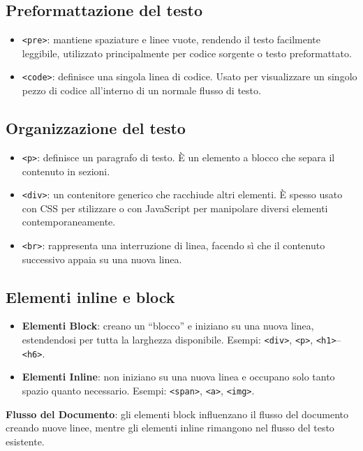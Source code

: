 \subsection{Preformattazione del testo}

\begin{itemize}
    \item \texttt{<pre>}: mantiene spaziature e linee vuote, rendendo il testo facilmente leggibile, utilizzato principalmente per codice sorgente o testo preformattato.
    \item \texttt{<code>}: definisce una singola linea di codice. Usato per visualizzare un singolo pezzo di codice all'interno di un normale flusso di testo.
\end{itemize}

\subsection{Organizzazione del testo}

\begin{itemize}
    \item \texttt{<p>}: definisce un paragrafo di testo. È un elemento a blocco che separa il contenuto in sezioni.
    \item \texttt{<div>}: un contenitore generico che racchiude altri elementi. È spesso usato con CSS per stilizzare o con JavaScript per manipolare diversi elementi contemporaneamente.
    \item \texttt{<br>}: rappresenta una interruzione di linea, facendo sì che il contenuto successivo appaia su una nuova linea.
\end{itemize}

\subsection{Elementi inline e block}

\begin{itemize}
    \item \textbf{Elementi Block}: creano un ``blocco'' e iniziano su una nuova linea, estendendosi per tutta la larghezza disponibile. Esempi: \texttt{<div>}, \texttt{<p>}, \texttt{<h1>}--\texttt{<h6>}.
    \item \textbf{Elementi Inline}: non iniziano su una nuova linea e occupano solo tanto spazio quanto necessario. Esempi: \texttt{<span>}, \texttt{<a>}, \texttt{<img>}.
\end{itemize}

\textbf{Flusso del Documento}: gli elementi block influenzano il flusso del documento creando nuove linee, mentre gli elementi inline rimangono nel flusso del testo esistente.


